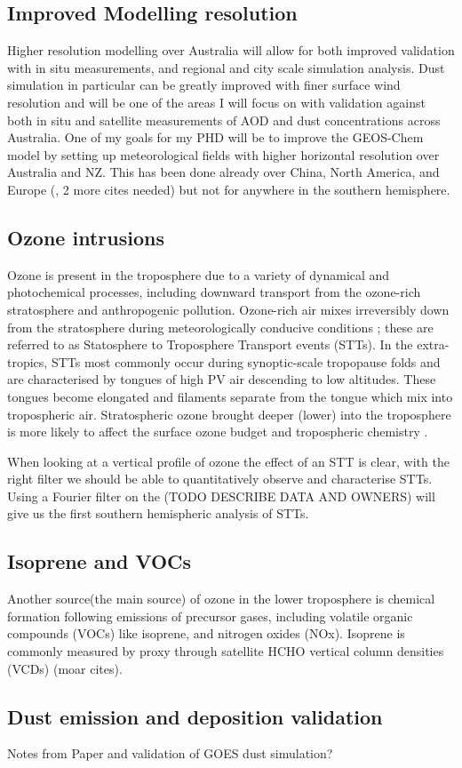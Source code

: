 \subsection{Improved Modelling resolution}
Higher resolution modelling over Australia will allow for both improved validation with in situ measurements, and regional and city scale simulation analysis. 
Dust simulation in particular can be greatly improved with finer surface wind resolution and will be one of the areas I will focus on with validation against both in situ and satellite measurements of AOD and dust concentrations across Australia.
One of my goals for my PHD will be to improve the GEOS-Chem model by setting up meteorological fields with higher horizontal resolution over Australia and NZ.
This has been done already over China, North America, and Europe (\cite{Chen_2009}, 2 more cites needed) but not for anywhere in the southern hemisphere.

\subsection{Ozone intrusions}
Ozone is present in the troposphere due to a variety of dynamical and photochemical processes, including downward  transport from the ozone-rich stratosphere and anthropogenic pollution.
Ozone-rich air mixes irreversibly down from the stratosphere during meteorologically conducive conditions \citep{Sprenger2003,Mihalikova2012}; these are referred to as Statosphere to Troposphere Transport events (STTs). 
In the extra-tropics, STTs most commonly occur during synoptic-scale tropopause folds \citep{Sprenger2003} and are characterised by tongues of high PV air descending to low altitudes.
These tongues become elongated and filaments separate from the tongue which mix into tropospheric air.
Stratospheric ozone brought deeper (lower) into the troposphere is more likely to affect the surface ozone budget and tropospheric chemistry \citep{Zanis2003}.

When looking at a vertical profile of ozone the effect of an STT is clear, with the right filter we should be able to quantitatively observe and characterise STTs.
Using a Fourier filter on the (TODO DESCRIBE DATA AND OWNERS) will give us the first southern hemispheric analysis of STTs.

\subsection{Isoprene and VOCs}
Another source(the main source) of ozone in the lower troposphere is chemical formation following emissions of precursor gases, including volatile organic compounds (VOCs) like isoprene, and nitrogen oxides (NOx).
Isoprene is commonly measured by proxy through satellite HCHO vertical column densities (VCDs) \cite{Marais_2012,bauwens2013satellite}(moar cites).

\subsection{Dust emission and deposition validation}
Notes from Paper and validation of GOES dust simulation?
  